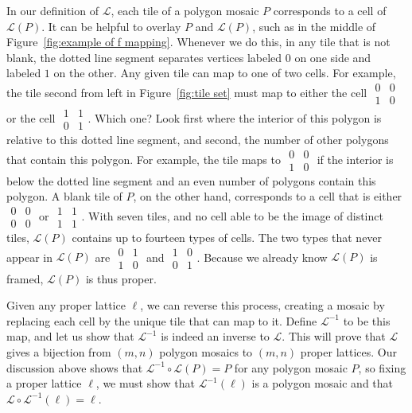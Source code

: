 \documentclass[12pt]{article}
\theoremstyle{plain}
\theoremstyle{remark}
\theoremstyle{definition}
\theoremstyle{remark}
\theoremstyle{definition}
\begin{document}
In our definition of $\mathscr{L}$, each tile of a polygon mosaic $P$ corresponds to a cell of $\mathscr{L}\left(P\right)$. It can be helpful to overlay $P$ and $\mathscr{L}(P)$, such as in the middle of Figure~\ref{fig:example of f mapping}. Whenever we do this, in any tile that is not blank, the dotted line segment separates vertices labeled $0$ on one side and labeled $1$ on the other. Any given tile can map to one of two cells. For example, the tile second from left in Figure~\ref{fig:tile set} must map to either the cell $\begin{smallmatrix} 0 & 0 \\ 1 & 0 \end{smallmatrix}$ or the cell $\begin{smallmatrix} 1 & 1 \\ 0 & 1 \end{smallmatrix}$. Which one? Look first where the interior of this polygon is relative to this dotted line segment, and second, the number of other polygons that contain this polygon. For example, the tile maps to $\begin{smallmatrix} 0 & 0 \\ 1 & 0 \end{smallmatrix}$ if the interior is below the dotted line segment and an even number of polygons contain this polygon. A blank tile of $P$, on the other hand, corresponds to a cell that is either $\begin{smallmatrix} 0 & 0 \\ 0 & 0 \end{smallmatrix}$ or $\begin{smallmatrix} 1 & 1 \\ 1 & 1 \end{smallmatrix}$. With seven tiles, and no cell able to be the image of distinct tiles, $\mathscr{L}\left(P\right)$ contains up to fourteen types of cells. The two types that never appear in $\mathscr{L}\left(P\right)$ are $\begin{smallmatrix} 0 & 1 \\ 1 & 0 \end{smallmatrix}$ and $\begin{smallmatrix} 1 & 0 \\ 0 & 1 \end{smallmatrix}$. Because we already know $\mathscr{L}(P)$ is framed, $\mathscr{L}(P)$  is thus proper.

Given any proper lattice $\ell$, we can reverse this process, creating a mosaic by replacing each cell by the unique tile that can map to it. Define $\mathscr{L}^{-1}$ to be this map, and let us show that $\mathscr{L}^{-1}$ is indeed an inverse to $\mathscr{L}$. This will prove that $\mathscr{L}$ gives a bijection from $\left(m,n\right)$ polygon mosaics to $\left(m,n\right)$ proper  lattices. Our discussion above shows that $\mathscr{L}^{-1}\circ\mathscr{L}\left(P\right)=P$ for any polygon mosaic $P$, so fixing a proper lattice $\ell$, we must show that $\mathscr{L}^{-1}\left(\ell\right)$ is a polygon mosaic and that $\mathscr{L}\circ\mathscr{L}^{-1}\left(\ell\right)=\ell$.
\end{document}
